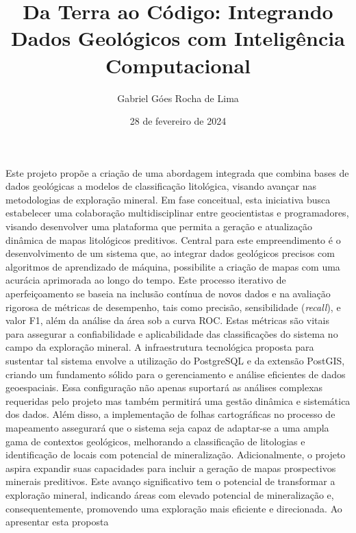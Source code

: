 \documentclass[11pt]{article} %
\begin{document}
\title{Da Terra ao Código: Integrando Dados Geológicos com Inteligência Computacional} %
\author{Gabriel Góes Rocha de Lima} %
\date{28 de fevereiro de 2024} %
\maketitle %

\newcommand{\italic}[1]{\textit{#1}}

\par{
Este projeto propõe a criação de uma abordagem integrada que combina bases de dados
geológicas a modelos de classificação litológica, visando avançar nas
metodologias de exploração mineral. Em fase conceitual, esta iniciativa busca estabelecer
uma colaboração multidisciplinar entre geocientistas e programadores, visando
desenvolver uma plataforma que permita a geração e atualização dinâmica de mapas
litológicos preditivos. Central para este empreendimento é o desenvolvimento de um
sistema que, ao integrar dados geológicos precisos com algoritmos de aprendizado de
máquina, possibilite a criação de mapas com uma acurácia aprimorada ao longo do tempo.
Este processo iterativo de aperfeiçoamento se baseia na inclusão contínua de novos dados
e na avaliação rigorosa de métricas de desempenho, tais como precisão, sensibilidade
(\italic{recall}), e valor F1, além da análise da área sob a curva ROC. Estas métricas são vitais
para assegurar a confiabilidade e aplicabilidade das classificações do sistema no campo
da exploração mineral. A infraestrutura tecnológica proposta para sustentar tal sistema
envolve a utilização do PostgreSQL e da extensão PostGIS, criando um fundamento sólido
para o gerenciamento e análise eficientes de dados geoespaciais. Essa configuração não
apenas suportará as análises complexas requeridas pelo projeto mas também permitirá
uma gestão dinâmica e sistemática dos dados. Além disso, a implementação de folhas
cartográficas no processo de mapeamento assegurará que o sistema seja capaz de
adaptar-se a uma ampla gama de contextos geológicos, melhorando a classificação de
litologias e identificação de locais com potencial de mineralização. Adicionalmente, o
projeto aspira expandir suas capacidades para incluir a geração de mapas prospectivos
minerais preditivos. Este avanço significativo tem o potencial de transformar a exploração
mineral, indicando áreas com elevado potencial de mineralização e, consequentemente,
promovendo uma exploração mais eficiente e direcionada. Ao apresentar esta proposta
}
\end{document}
